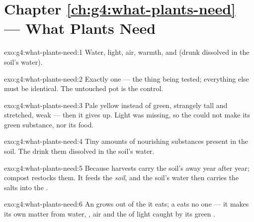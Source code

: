 \section*{Chapter \ref{ch:g4:what-plants-need} --- What Plants Need}

\begin{solution}{exo:g4:what-plants-need:1}
Water, light, air, warmth, and  (drunk dissolved in
the soil's water).
\end{solution}

\begin{solution}{exo:g4:what-plants-need:2}
Exactly one --- the thing being tested; everything else must be
identical. The untouched pot is the control.
\end{solution}

\begin{solution}{exo:g4:what-plants-need:3}
Pale yellow instead of green, strangely tall and stretched, weak
--- then it gives up. Light was missing, so the  could not
make its green substance, nor its food.
\end{solution}

\begin{solution}{exo:g4:what-plants-need:4}
Tiny amounts of nourishing substances present in the soil. The
 drink them dissolved in the soil's water.
\end{solution}

\begin{solution}{exo:g4:what-plants-need:5}
Because harvests carry the soil's  away year after
year; compost restocks them. It feeds the \emph{soil}, and the
soil's water then carries the salts into the .
\end{solution}

\begin{solution}{exo:g4:what-plants-need:6}
An  grows out of the  it eats; a  eats
no one --- it makes its own matter from water, ,
air and the  of light caught by its green .
\end{solution}

